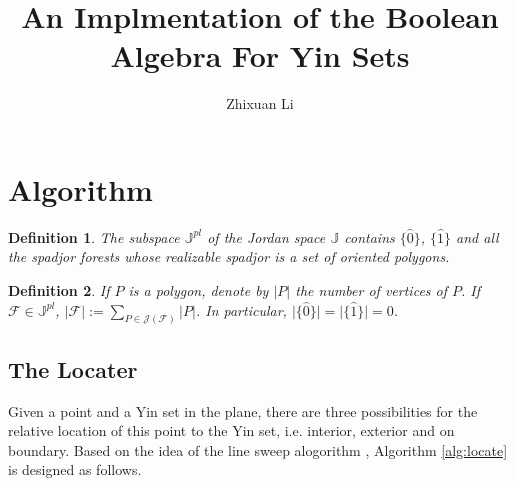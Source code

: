 \documentclass[a4paper]{article}
\title{An Implmentation of the Boolean Algebra For Yin Sets}
\author{Zhixuan Li}
\newtheorem{definition}{Definition}
\newcommand{\bJ}{\mathbb{J}}
\newcommand{\bJpl}{\mathbb{J}^{pl}}
\newcommand{\zerohat}{\hat{0}}
\newcommand{\onehat}{\hat{1}}
\newcommand{\cF}{\mathcal{F}}
\newcommand{\cJ}{\mathcal{J}}
\begin{document}
\maketitle

\section{Algorithm}

\begin{definition}
  The subspace $\bJpl$ of the Jordan space $\bJ$
  contains $\{\zerohat\}$, $\{\onehat\}$
  and all the spadjor forests whose realizable spadjor is a set of oriented polygons.
\end{definition}

\begin{definition}
If $P$ is a polygon, denote by $\vert P \vert$ the number of vertices of $P$. 
If $\cF \in \bJpl$, $\vert \cF \vert := \sum_{P \in \cJ(\cF)} \vert P \vert$.
In particular, $\vert\{\zerohat\} \vert = \vert \{\onehat\}  \vert = 0$.
\end{definition}

\subsection{The Locater}
Given a point and a Yin set in the plane,
there are three possibilities for the relative location of this point to the Yin set, 
i.e. interior, exterior and on boundary.
Based on the idea of the line sweep alogorithm \cite{CG},
Algorithm \ref{alg:locate} is designed as follows.
\end{document}

